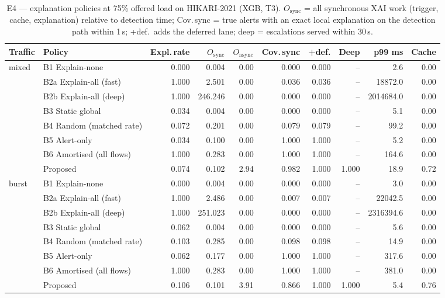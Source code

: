 \begin{table}[!htbp]
\centering
\caption{E4 --- explanation policies at 75\% offered load on HIKARI-2021 (XGB, T3). $O_{\mathrm{sync}}$ = all synchronous XAI work (trigger, cache, explanation) relative to detection time; Cov.\,sync = true alerts with an exact local explanation on the detection path within 1\,s; +def.\ adds the deferred lane; deep = escalations served within 30\,s.}
\label{tab:stream:hikari_XGB_T3}
\scriptsize
\setlength{\tabcolsep}{3.5pt}
\begin{tabular}{llrrrrrrrr}
\toprule
\textbf{Traffic} & \textbf{Policy} & \textbf{Expl.\,rate} & \textbf{$O_{\mathrm{sync}}$} & \textbf{$O_{\mathrm{async}}$} & \textbf{Cov.\,sync} & \textbf{+def.} & \textbf{Deep} & \textbf{p99 ms} & \textbf{Cache} \\
\midrule
mixed & B1 Explain-none & 0.000 & 0.004 & 0.00 & 0.000 & 0.000 & -- & 2.6 & 0.00 \\
 & B2a Explain-all (fast) & 1.000 & 2.501 & 0.00 & 0.036 & 0.036 & -- & 18872.0 & 0.00 \\
 & B2b Explain-all (deep) & 1.000 & 246.246 & 0.00 & 0.000 & 0.000 & -- & 2014684.0 & 0.00 \\
 & B3 Static global & 0.034 & 0.004 & 0.00 & 0.000 & 0.000 & -- & 5.1 & 0.00 \\
 & B4 Random (matched rate) & 0.072 & 0.201 & 0.00 & 0.079 & 0.079 & -- & 99.2 & 0.00 \\
 & B5 Alert-only & 0.034 & 0.100 & 0.00 & 1.000 & 1.000 & -- & 5.2 & 0.00 \\
 & B6 Amortised (all flows) & 1.000 & 0.283 & 0.00 & 1.000 & 1.000 & -- & 164.6 & 0.00 \\
 & Proposed & 0.074 & 0.102 & 2.94 & 0.982 & 1.000 & 1.000 & 18.9 & 0.72 \\
\midrule
burst & B1 Explain-none & 0.000 & 0.004 & 0.00 & 0.000 & 0.000 & -- & 3.0 & 0.00 \\
 & B2a Explain-all (fast) & 1.000 & 2.486 & 0.00 & 0.007 & 0.007 & -- & 22042.5 & 0.00 \\
 & B2b Explain-all (deep) & 1.000 & 251.023 & 0.00 & 0.000 & 0.000 & -- & 2316394.6 & 0.00 \\
 & B3 Static global & 0.062 & 0.004 & 0.00 & 0.000 & 0.000 & -- & 5.6 & 0.00 \\
 & B4 Random (matched rate) & 0.103 & 0.285 & 0.00 & 0.098 & 0.098 & -- & 14.9 & 0.00 \\
 & B5 Alert-only & 0.062 & 0.177 & 0.00 & 1.000 & 1.000 & -- & 317.6 & 0.00 \\
 & B6 Amortised (all flows) & 1.000 & 0.283 & 0.00 & 1.000 & 1.000 & -- & 381.0 & 0.00 \\
 & Proposed & 0.106 & 0.101 & 3.91 & 0.866 & 1.000 & 1.000 & 5.4 & 0.76 \\
\bottomrule
\end{tabular}
\end{table}
